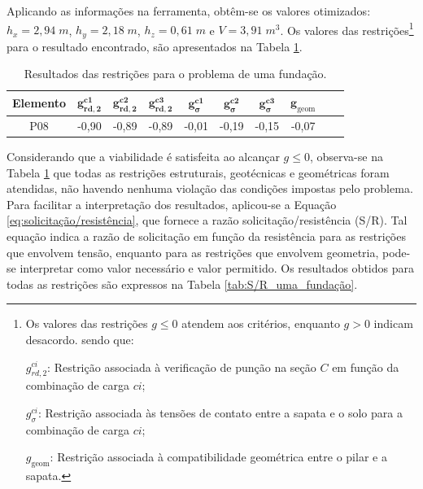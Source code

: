 Aplicando as informações na ferramenta, obtêm-se os valores otimizados: $h_x = 2,94\;m$, $h_y = 2,18\;m$, $h_z = 0,61\;m$ e $V = 3,91 \; m^3$. Os valores das restrições\footnote{ Os valores das restrições $g \le 0$ atendem aos critérios, enquanto $g > 0$ indicam desacordo. sendo que:

$g_{rd,2}^{ci}$: Restrição associada à verificação de punção na seção $C$ em função da combinação de carga $ci$; 

$g_{\sigma}^{ci}$: Restrição associada às tensões de contato entre a sapata e o solo para a combinação de carga $ci$; 

$g_{\mathrm{geom}}$: Restrição associada à compatibilidade geométrica entre o pilar e a sapata.} para o resultado encontrado, são apresentados na Tabela \ref{tab:resultado_g_uma_fundacao}.




\begin{table}[H]
\centering

\label{tab:resultado_g_uma_fundacao}
\begin{tabular}{cccccccccc}
\toprule
\textbf{Elemento} &
$\mathbf{g_{rd,2}^{c1}}$ &
$\mathbf{g_{rd,2}^{c2}}$ &
$\mathbf{g_{rd,2}^{c3}}$ &
$\mathbf{g_{\sigma}^{c1}}$ &
$\mathbf{g_{\sigma}^{c2}}$ &
$\mathbf{g_{\sigma}^{c3}}$ &
$\mathbf{g_{\mathrm{geom}}}$ \\
\midrule
 P08 & -0,90 & -0,89 & -0,89 & -0,01 & -0,19 & -0,15 & -0,07 \\
\bottomrule
\end{tabular}
\caption{Resultados das restrições para o problema de uma fundação.}
\end{table}

Considerando que a viabilidade é satisfeita ao alcançar $g \le 0$, observa-se na Tabela \ref{tab:resultado_g_uma_fundacao} que todas as restrições estruturais, geotécnicas e geométricas foram atendidas, não havendo nenhuma violação das condições impostas pelo problema. Para facilitar a interpretação dos resultados, aplicou-se a Equação \eqref{eq:solicitação/resistência}, que fornece a razão solicitação/resistência (S/R). Tal equação indica a razão de solicitação em função da resistência para as restrições que envolvem tensão, enquanto para as restrições que envolvem geometria, pode-se interpretar como valor necessário e valor permitido. Os resultados obtidos para todas as restrições são expressos na Tabela \ref{tab:S/R_uma_fundação}.


